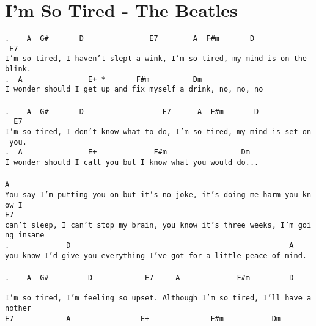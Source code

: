 \newpage
\section{I'm So Tired - The Beatles}
\label{I'm So Tired - The Beatles}
\texttt{.\ \ \ \ A\ \ G\#\ \ \ \ \ \ \ D\ \ \ \ \ \ \ \ \ \ \ \ \ \ \ E7\ \ \ \ \ \ \ \ A\ \ F\#m\ \ \ \ \ \ \ D\ \ \ \ \ \ \ \ \ \ \ \ \ \ E7\\
I'm\ so\ tired,\ I\ haven't\ slept\ a\ wink,\ I'm\ so\ tired,\ my\ mind\ is\ on\ the\ blink.\\
.\ \ A\ \ \ \ \ \ \ \ \ \ \ \ \ \ \ E+\ *\ \ \ \ \ \ \ F\#m\ \ \ \ \ \ \ \ \ \ Dm\\
I\ wonder\ should\ I\ get\ up\ and\ fix\ myself\ a\ drink,\ no,\ no,\ no\\
\\
.\ \ \ \ A\ \ G\#\ \ \ \ \ \ \ D\ \ \ \ \ \ \ \ \ \ \ \ \ \ \ \ \ \ E7\ \ \ \ \ \ A\ \ F\#m\ \ \ \ \ \ \ D\ \ \ \ \ \ \ \ \ \ \ \ \ \ E7\\
I'm\ so\ tired,\ I\ don't\ know\ what\ to\ do,\ I'm\ so\ tired,\ my\ mind\ is\ set\ on\ you.\\
.\ \ A\ \ \ \ \ \ \ \ \ \ \ \ \ \ \ E+\ \ \ \ \ \ \ \ \ \ \ \ \ F\#m\ \ \ \ \ \ \ \ \ \ \ \ \ \ \ \ \ Dm\\
I\ wonder\ should\ I\ call\ you\ but\ I\ know\ what\ you\ would\ do...\\
\\
A\\
You\ say\ I'm\ putting\ you\ on\ but\ it's\ no\ joke,\ it's\ doing\ me\ harm\ you\ know\ I\\
E7\\
can't\ sleep,\ I\ can't\ stop\ my\ brain,\ you\ know\ it's\ three\ weeks,\ I'm\ going\ insane\\
.\ \ \ \ \ \ \ \ \ \ \ \ \ D\ \ \ \ \ \ \ \ \ \ \ \ \ \ \ \ \ \ \ \ \ \ \ \ \ \ \ \ \ \ \ \ \ \ \ \ \ \ \ \ \ \ \ \ \ \ \ \ \ \ A\\
you\ know\ I'd\ give\ you\ everything\ I've\ got\ for\ a\ little\ peace\ of\ mind.\\
\\
.\ \ \ \ A\ \ G\#\ \ \ \ \ \ \ \ \ D\ \ \ \ \ \ \ \ \ \ \ \ E7\ \ \ \ \ A\ \ \ \ \ \ \ \ \ \ \ \ \ F\#m\ \ \ \ \ \ \ \ \ D\ \ \ \ \ \ \ \ \ \ \\
I'm\ so\ tired,\ I'm\ feeling\ so\ upset.\ Although\ I'm\ so\ tired,\ I'll\ have\ another\\
E7\ \ \ \ \ \ \ \ \ \ \ \ A\ \ \ \ \ \ \ \ \ \ \ \ \ \ \ \ E+\ \ \ \ \ \ \ \ \ \ \ \ \ \ F\#m\ \ \ \ \ \ \ \ \ \ \ Dm\\
}
